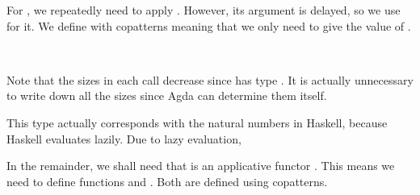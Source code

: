 For , we repeatedly need to apply .
However, its argument is delayed, so we use  for it.
We define  with copatterns meaning that we only need to give the value of  .

\begin{code}%
\>[0]\AgdaSpace{}%
\AgdaSymbol{\{}\AgdaSymbol{\}}\AgdaSpace{}%
\AgdaSymbol{=}\AgdaSpace{}%
\AgdaSpace{}%
\AgdaSymbol{(}\AgdaSpace{}%
\AgdaSymbol{\{}\AgdaSymbol{\})}\<%
\\
\>[0]\AgdaSpace{}%
\AgdaSymbol{(}\AgdaSpace{}%
\AgdaSymbol{\{}\AgdaSymbol{\})}\AgdaSpace{}%
\AgdaSymbol{\{}\AgdaSymbol{\}}\AgdaSpace{}%
\AgdaSymbol{=}\AgdaSpace{}%
\AgdaSpace{}%
\AgdaSymbol{\{}\AgdaSymbol{\}}\<%
\end{code}

Note that the sizes in each call decrease since  has type  .
It is actually unnecessary to write down all the sizes since Agda can determine them itself.

This type actually corresponds with the natural numbers in Haskell, because Haskell evaluates lazily.
Due to lazy evaluation, 

In the remainder, we shall need that  is an applicative functor \cite{mcbride2008applicative}.
This means we need to define functions  and .
Both are defined using copatterns.

